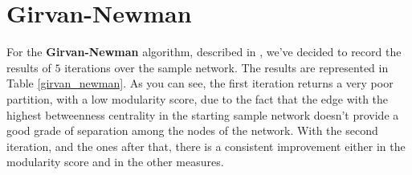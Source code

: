 
\section{Girvan-Newman} %
\label{sec:girvan_newman}
    For the \textbf{Girvan-Newman} algorithm, described in \cite{girvan_newman}, we've decided to record
    the results of $5$ iterations over the sample network. The results are represented in Table
    \ref{girvan_newman}. As you can see, the first iteration returns a very poor partition, with a low modularity
    score, due to the fact that the edge with the highest betweenness centrality in the starting sample network
    doesn't provide a good grade of separation among the nodes of the network. With the second iteration, and the
    ones after that, there is a consistent improvement either in the modularity score and in the other measures.
    \begin{table}[H]
        \centering
        \begin{subtable}{\textwidth}
        \end{subtable}
        \caption{Evaluation of the partition obtained by the application of the Girvan-Newman algorithm.}
        \label{girvan_newman}
    \end{table}

